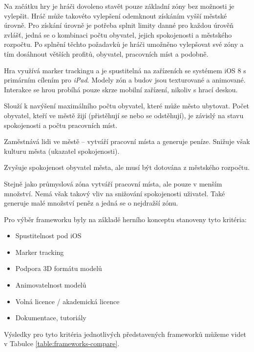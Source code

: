\documentclass[twoside,12pt]{article}
\begin{document}
Na začátku hry je hráči dovoleno stavět pouze základní zóny bez možnosti je vylepšit. Hráč může takovéto vylepšení odemknout získáním vyšší městské úrovně. Pro získání úrovně je potřeba splnit limity danné pro každou úrověň zvlášť, jedná se o kombinaci počtu obyvatel, jejich spokojenosti a městského rozpočtu. Po splnění těchto požadavků je hráči umožněno vylepšovat své zóny a tím dosáhnout větších profitů, obyvatel, pracovních míst a podobně.

Hra využívá marker trackingu a je spustitelná na zařízeních se systémem iOS 8 s primárním cílením pro \textit{iPad}. Modely zón a budov jsou texturované a animované. Interakce se hrou probíhá pouze skrze mobilní zařízení, nikoliv s hrací deskou.

Slouží k navýšení maximálního počtu obyvatel, které může město ubytovat. Počet obyvatel, kteří ve městě žijí (přistěhují se nebo se odstěhují), je závislý na stavu spokojenosti a počtu pracovních míst.

Zaměstnává lidi ve městě -- vytváří pracovní místa a generuje peníze. Snižuje však kulturu města (ukazatel spokojenosti). 

Zvyšuje spokojenost obyvatel města, ale musí být dotována z městského rozpočtu.

Stejně jako průmyslová zóna vytváří pracovní místa, ale pouze v menším množství. Nemá však takový vliv na snižování spokojenosti uživatel. Také generuje malé množství peněz a jedná se o nejdražší zónu.


Pro výběr frameworku byly na základě herního konceptu stanoveny tyto kritéria:
\begin{itemize}
	\item Spustitelnost pod iOS
	\item Marker tracking
	\item Podpora 3D formátu modelů
	\item Animovatelnost modelů
	\item Volná licence / akademická licence
	\item Dokumentace, tutoriály
\end{itemize}

Výsledky pro tyto kritéria jednotlivých představených frameworků můžeme videt v Tabulce \ref{table:frameworks-compare}.

\end{document}
